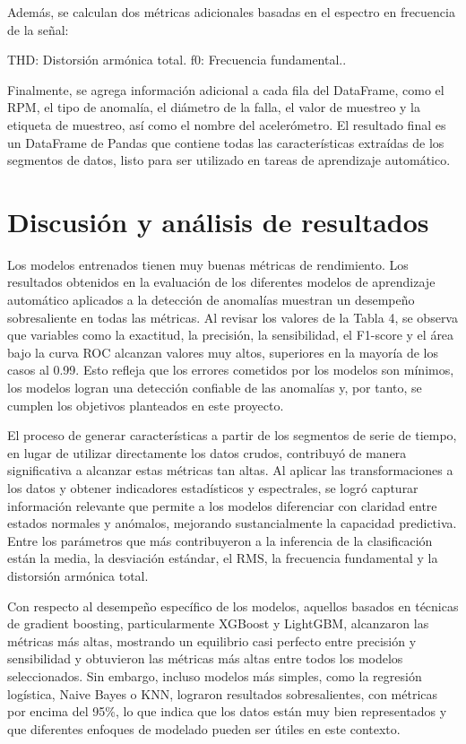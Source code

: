 \documentclass[11pt,a4paper,spanish]{book}
\numberwithin{equation}{chapter}
\numberwithin{figure}{chapter}
\begin{document}
Además, se calculan dos métricas adicionales basadas en el espectro en frecuencia de la señal:


THD: Distorsión armónica total.
f0: Frecuencia fundamental..


Finalmente, se agrega información adicional a cada fila del DataFrame, como el RPM, el tipo de anomalía, el diámetro de la falla, el valor de muestreo y la etiqueta de muestreo, así como el nombre del acelerómetro. El resultado final es un DataFrame de Pandas que contiene todas las características extraídas de los segmentos de datos, listo para ser utilizado en tareas de aprendizaje automático.




\chapter{Discusión y análisis de resultados}

Los modelos entrenados tienen muy buenas métricas de rendimiento. 
Los resultados obtenidos en la evaluación de los diferentes modelos de aprendizaje 
automático aplicados a la detección de anomalías muestran un desempeño sobresaliente 
en todas las métricas. 
Al revisar los valores de la Tabla 4, se observa que variables como la exactitud, 
la precisión, la sensibilidad, el F1-score y el área bajo la curva ROC alcanzan 
valores muy altos, superiores en la mayoría de los casos al 0.99. Esto refleja que los 
errores cometidos por los modelos son mínimos, los modelos logran una detección 
confiable de las anomalías y, por tanto, se cumplen los objetivos planteados en 
este proyecto.


El proceso de generar características a partir de los segmentos de serie de tiempo, 
en lugar de utilizar directamente los datos crudos, contribuyó de manera significativa 
a alcanzar estas métricas tan altas. Al aplicar las transformaciones a los datos y 
obtener indicadores estadísticos y espectrales, se logró capturar información relevante 
que permite a los modelos diferenciar con claridad entre estados normales y anómalos, 
mejorando sustancialmente la capacidad predictiva. Entre los parámetros que más 
contribuyeron a la inferencia de la clasificación están la media, la desviación estándar, 
el RMS, la frecuencia fundamental y la distorsión armónica total.


Con respecto al desempeño específico de los modelos, aquellos basados en técnicas de 
gradient boosting, particularmente XGBoost y LightGBM, alcanzaron las métricas más altas, 
mostrando un equilibrio casi perfecto entre precisión y sensibilidad y obtuvieron las 
métricas más altas entre todos los modelos seleccionados. Sin embargo, incluso modelos 
más simples, como la regresión logística, Naive Bayes o KNN, lograron resultados 
sobresalientes, con métricas por encima del 95\%, lo que indica que los datos están muy 
bien representados y que diferentes enfoques de modelado pueden ser útiles en este 
contexto.
\end{document}
